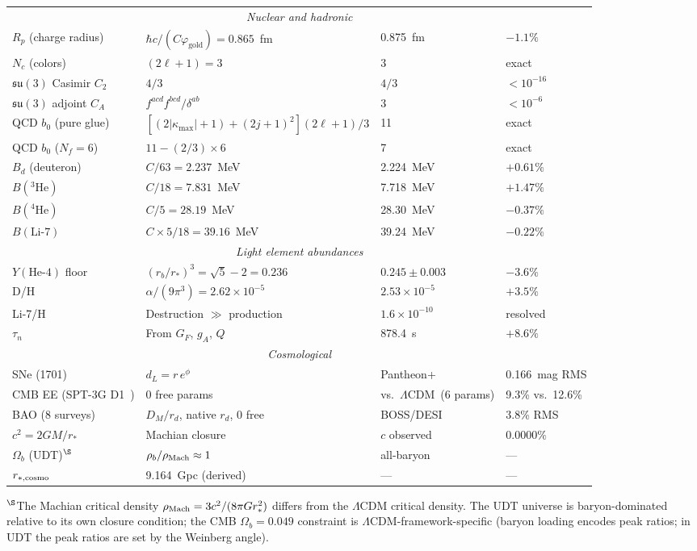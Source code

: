 \documentclass[aps,prd,twocolumn,superscriptaddress,nofootinbib,longbibliography]{revtex4-2}
\newcommand{\rstar}{r_{*}}
\newcommand{\kmax}{|\kappa_{\mathrm{max}}|}
\newcommand{\vgold}{\varphi_{\mathrm{gold}}}
\begin{document}
\begin{table}[t]
\begin{ruledtabular}
\begin{tabular}{llll}
\multicolumn{4}{c}{\textit{Nuclear and hadronic}} \\[3pt]
$R_p$ (charge radius) & $\hbar c/(C\vgold) = 0.865$~fm
  & 0.875~fm & $-1.1\%$ \\
$N_c$ (colors) & $(2\ell+1) = 3$ & $3$ & exact \\
$\mathfrak{su}(3)$ Casimir $C_2$ & $4/3$ & $4/3$ & $< 10^{-16}$ \\
$\mathfrak{su}(3)$ adjoint $C_A$ & $f^{acd}f^{bcd}/\delta^{ab}$ & 3 & $< 10^{-6}$ \\
QCD $b_0$ (pure glue) & $[(2\kmax\!+\!1)\!+\!(2j\!+\!1)^2](2\ell\!+\!1)/3$ & 11 & exact \\
QCD $b_0$ ($N_f\!=\!6$) & $11 - (2/3) \times 6$ & 7 & exact \\
$B_d$ (deuteron) & $C/63 = 2.237$~MeV & 2.224~MeV & $+0.61\%$ \\
$B({}^3\text{He})$ & $C/18 = 7.831$~MeV & 7.718~MeV & $+1.47\%$ \\
$B({}^4\text{He})$ & $C/5 = 28.19$~MeV & 28.30~MeV & $-0.37\%$ \\
$B(\text{Li-7})$ & $C \times 5/18 = 39.16$~MeV & 39.24~MeV & $-0.22\%$ \\[6pt]
\multicolumn{4}{c}{\textit{Light element abundances}} \\[3pt]
$Y(\text{He-4})$ floor & $(r_b/r_*)^3 = \sqrt{5}-2 = 0.236$
  & $0.245 \pm 0.003$ & $-3.6\%$ \\
D/H & $\alpha/(9\pi^3) = 2.62 \times 10^{-5}$
  & $2.53 \times 10^{-5}$ & $+3.5\%$ \\
Li-7/H & Destruction $\gg$ production
  & $1.6 \times 10^{-10}$ & resolved \\
$\tau_n$ & From $G_F$, $g_A$, $Q$ & 878.4~s & $+8.6\%$ \\[6pt]
\multicolumn{4}{c}{\textit{Cosmological}} \\[3pt]
SNe (1701) & $d_L = r\,e^{\phi}$
  & Pantheon+ & 0.166~mag RMS \\
CMB EE (SPT-3G D1~\cite{SPT3GD1}) & 0 free params
  & vs.\ $\Lambda$CDM~(6 params) & 9.3\% vs.\ 12.6\% \\
BAO (8 surveys) & $D_M/r_d$, native $r_d$, 0 free
  & BOSS/DESI & 3.8\% RMS \\
$c^2 = 2GM/\rstar$ & Machian closure
  & $c$ observed & $0.0000\%$ \\
$\Omega_{b}$ (UDT)$^\S$ & $\rho_b/\rho_{\rm Mach} \approx 1$
  & all-baryon & --- \\
$r_{*,\rm cosmo}$ & 9.164~Gpc (derived) & --- & --- \\
\end{tabular}
\end{ruledtabular}
{\footnotesize $^\S$The Machian critical density
$\rho_{\rm Mach} = 3c^2/(8\pi G r_*^2)$ differs from the
$\Lambda$CDM critical density.  The UDT universe is baryon-dominated
relative to its own closure condition; the CMB $\Omega_b = 0.049$
constraint is $\Lambda$CDM-framework-specific (baryon loading encodes
peak ratios; in UDT the peak ratios are set by the Weinberg angle).}
\end{table}
\endgroup
\end{document}
